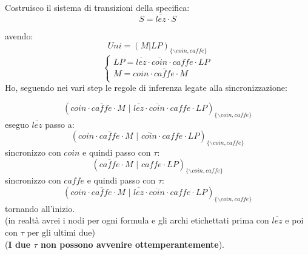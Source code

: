 \begin{esempio}
  Costruisco il sistema di transizioni della specifica:
  \[S=\overline{lez}\cdot S\]
  \begin{center}
  \end{center}
  avendo:
  \[Uni=(M|LP)_{\{\backslash coin, caffe\}}\]
  \[
\begin{cases} 
    LP = \overline{lez}\cdot\overline{coin}\cdot caffe\cdot LP\\
    M = coin\cdot \overline{caffe}\cdot M\\
\end{cases}
\]
  Ho, seguendo nei vari step le regole di inferenza legate alla
  sincronizzazione:
  
  \[(coin\cdot \overline{caffe}\cdot
    M\,\,|\,\,\overline{lez}\cdot\overline{coin}\cdot caffe\cdot
    LP)_{\{\backslash coin, caffe\}}\]
  eseguo $\overline{lez}$ passo a:
  \[(coin\cdot \overline{caffe}\cdot
    M\,\,|\,\,\overline{coin}\cdot caffe\cdot
    LP)_{\{\backslash coin, caffe\}}\]
  sincronizzo con $coin$ e quindi passo con $\tau$:
  \[(\overline{caffe}\cdot
    M\,\,|\,\, caffe\cdot
    LP)_{\{\backslash coin, caffe\}}\]
  sincronizzo con $caffe$ e quindi passo con $\tau$:
   \[(coin\cdot \overline{caffe}\cdot
    M\,\,|\,\,\overline{lez}\cdot\overline{coin}\cdot caffe\cdot
    LP)_{\{\backslash coin, caffe\}}\]
  tornando all'inizio.\\
  (in realtà avrei i nodi per ogni formula e gli archi etichettati prima con
  $\overline{lez}$ e poi con $\tau$ per gli ultimi due)\\
  (\textbf{I due $\tau$ non possono avvenire ottemperantemente}).\\
  
\end{esempio}

